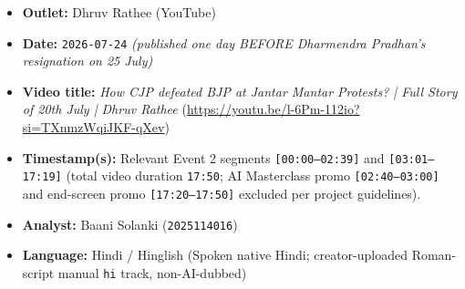 \documentclass[10pt,a4paper]{article}
\begin{document}
\begin{itemize}[leftmargin=1.5em, itemsep=3pt, topsep=4pt]
  \item \textbf{Outlet:} Dhruv Rathee (YouTube)
  \item \textbf{Date:} \texttt{2026-07-24} \textit{(published one day BEFORE Dharmendra Pradhan's resignation on 25 July)}
  \item \textbf{Video title:} \textit{How CJP defeated BJP at Jantar Mantar Protests? | Full Story of 20th July | Dhruv Rathee} (\url{https://youtu.be/l-6Pm-112io?si=TXnmzWqiJKF-qXev})
  \item \textbf{Timestamp(s):} Relevant Event 2 segments \texttt{[00:00--02:39]} and \texttt{[03:01--17:19]} (total video duration \texttt{17:50}; AI Masterclass promo \texttt{[02:40--03:00]} and end-screen promo \texttt{[17:20--17:50]} excluded per project guidelines).
  \item \textbf{Analyst:} Baani Solanki (\texttt{2025114016})
  \item \textbf{Language:} Hindi / Hinglish (Spoken native Hindi; creator-uploaded Roman-script manual \texttt{hi} track, non-AI-dubbed)
\end{itemize}
\end{document}
